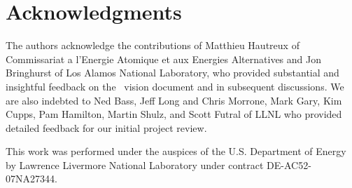 \section {Acknowledgments}
The authors acknowledge the contributions of Matthieu Hautreux
of Commissariat a l'Energie Atomique et aux Energies Alternatives
and Jon Bringhurst of Los Alamos National Laboratory, who provided
substantial and insightful feedback on the \flux\ vision document
and in subsequent discussions.
We are also indebted to
Ned Bass, Jeff Long and Chris Morrone,
Mark Gary, Kim Cupps, Pam Hamilton, Martin Shulz, and Scott Futral
of LLNL who provided detailed feedback for our initial project review.
\ifcomments
{}
\fi

This work was performed under the auspices of the U.S. Department
of Energy by Lawrence Livermore National Laboratory under
contract DE-AC52-07NA27344.
